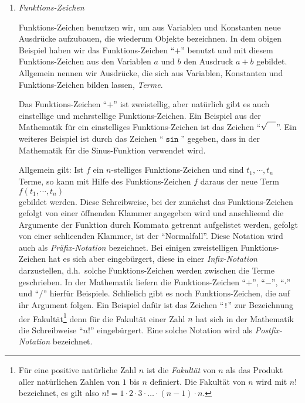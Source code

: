 \begin{enumerate}
\item \emph{Funktions-Zeichen}

      Funktions-Zeichen benutzen wir, um aus Variablen und Konstanten neue Ausdr\"ucke aufzubauen,
      die wiederum Objekte bezeichnen.  In dem obigen Beispiel haben wir das Funktions-Zeichen
      ``$+$'' benutzt und mit diesem Funktions-Zeichen aus den Variablen $a$ und $b$ den Ausdruck $a+b$
      gebildet.  Allgemein nennen wir Ausdr\"ucke, die sich aus Variablen, Konstanten und Funktions-Zeichen 
      bilden lassen, \emph{Terme}.  

      Das Funktions-Zeichen ``$+$'' ist zweistellig, aber nat\"urlich gibt es auch einstellige und
      mehrstellige Funktions-Zeichen. Ein Beispiel aus der Mathematik f\"ur ein einstelliges Funktions-Zeichen ist 
      das Zeichen ``$\sqrt{\rule{0pt}{9pt}\quad}$''.  Ein weiteres Beispiel
      ist durch das Zeichen ``$\mathtt{\sin}$'' gegeben, dass in der Mathematik f\"ur die
      Sinus-Funktion verwendet wird.

      Allgemein gilt: Ist $f$ ein $n$-stelliges Funktions-Zeichen und sind 
       $t_1, \cdots, t_n$ Terme,
      so kann mit Hilfe des Funktions-Zeichen $f$  daraus der neue Term \\[0.2cm]
      \hspace*{1.3cm} $f(t_1,\cdots,t_n)$ \\[0.2cm]
      gebildet werden.  Diese Schreibweise, bei der zun\"achst das Funktions-Zeichen
      gefolgt von einer \"offnenden Klammer angegeben wird und anschlie\3end die Argumente
      der Funktion durch Kommata getrennt aufgelistet werden, gefolgt von einer
      schlie\3enden Klammer, ist der ``Normalfall''.  Diese Notation wird auch als \emph{Pr\"afix-Notation}
      bezeichnet. Bei einigen zweistelligen Funktions-Zeichen hat es sich aber eingeb\"urgert, diese in einer
      \emph{Infix-Notation} darzustellen, d.h.~solche Funktions-Zeichen werden zwischen
      die Terme geschrieben. In der Mathematik liefern die  Funktions-Zeichen ``$+$'',
      ``$-$'', ``$\cdot $'' und ``$/$'' hierf\"ur Beispiele.  Schlie\3lich gibt es noch Funktions-Zeichen,
      die auf ihr Argument folgen.  Ein Beispiel daf\"ur ist das Zeichen ``\texttt{!}'' zur
      Bezeichnung der Fakult\"at\footnote{
      F\"ur eine positive nat\"urliche Zahl $n$ ist die \emph{Fakult\"at} von $n$ als das Produkt aller
      nat\"urlichen Zahlen von $1$ bis $n$ definiert.  Die Fakult\"at von $n$ wird mit $n!$ bezeichnet, 
      es gilt also $n! = 1 \cdot 2 \cdot 3 \cdot \dots \cdot (n-1) \cdot n$.}
      denn f\"ur die Fakult\"at einer Zahl $n$ hat sich in der Mathematik
      die Schreibweise ``$n!$'' eingeb\"urgert.  Eine solche Notation wird als \emph{Postfix-Notation}
      bezeichnet.


\end{enumerate}
